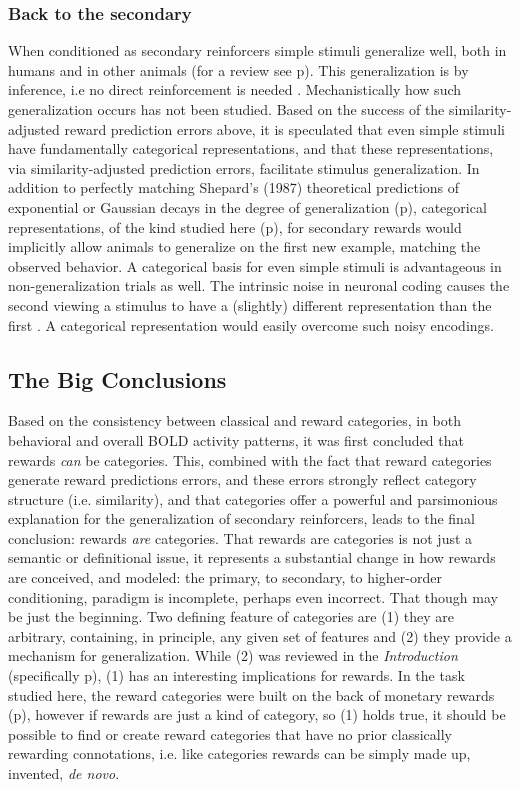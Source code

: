 \subsubsection{Back to the secondary}
\label{sub:generalsense}
When conditioned as secondary reinforcers simple stimuli generalize well, both in humans and in other animals (for a review see p\pageref{subsub:birds}).  This generalization is by inference, i.e no direct reinforcement is needed \cite{Guttman:1956p8355,Nakamura:2006p9093,Smith:2011p9101}.  Mechanistically how such generalization occurs has not been studied.  Based on the success of the similarity-adjusted reward prediction errors above, it is speculated that even simple stimuli have fundamentally categorical representations, and that these representations, via similarity-adjusted prediction errors, facilitate stimulus generalization.  In addition to perfectly matching Shepard's (1987) theoretical predictions of exponential or Gaussian decays in the degree of generalization (p\pageref{subsub:curves}), categorical representations, of the kind studied here (p\pageref{subsub:catquant}), for secondary rewards would implicitly allow animals to generalize on the first new example, matching the observed behavior.  A categorical basis for even simple stimuli is advantageous in non-generalization trials as well. The intrinsic noise in neuronal coding causes the second viewing a stimulus to have a (slightly) different representation than the first \cite{Ashby:1986p9783}.  A categorical representation would easily overcome such noisy encodings. 

\subsection{The Big Conclusions}
Based on the consistency between classical and reward categories, in both behavioral and overall BOLD activity patterns, it was first concluded that rewards \emph{can} be categories.  This, combined with the fact that reward categories generate reward predictions errors, and these errors strongly reflect category structure (i.e. similarity), and that categories offer a powerful and parsimonious explanation for the generalization of secondary reinforcers, leads to the final conclusion: rewards \emph{are} categories.
That rewards are categories is not just a semantic or definitional issue, it represents a substantial change in how rewards are conceived, and modeled: the primary, to secondary, to higher-order conditioning, paradigm is incomplete, perhaps even incorrect.  That though may be just the beginning.  Two defining feature of categories are (1) they are arbitrary, containing, in principle, any given set of features and (2) they provide a mechanism for generalization.  While (2) was reviewed in the \emph{Introduction} (specifically p\pageref{sub:gen}), (1) has an interesting implications for rewards.  In the task studied here, the reward categories were built on the back of monetary rewards (p\pageref{subsub:whatwhen}), however if rewards are just a kind of category, so (1) holds true, it should be possible to find or create reward categories that have no prior classically rewarding connotations, i.e. like categories rewards can be simply made up, invented, \emph{de novo}.

